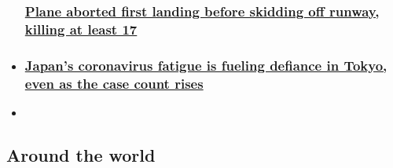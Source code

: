\begin{itemize}
{  \subsubsection{\texorpdfstring{\href{/2020/08/07/asia/plane-crash-calicut-india-intl/index.html}{Plane
  aborted first landing before skidding off runway, killing at least
  17}}{Plane aborted first landing before skidding off runway, killing at least 17}}\label{plane-aborted-first-landing-before-skidding-off-runway-killing-at-least-17}}
\item
  \hypertarget{japans-coronavirus-fatigue-is-fueling-defiance-in-tokyo-even-as-the-case-count-rises}{%
  \subsubsection{\texorpdfstring{\href{/2020/08/07/asia/tokyo-coronavirus-fatigue-intl-hnk/index.html}{Japan's
  coronavirus fatigue is fueling defiance in Tokyo, even as the case
  count
  rises}}{Japan's coronavirus fatigue is fueling defiance in Tokyo, even as the case count rises}}\label{japans-coronavirus-fatigue-is-fueling-defiance-in-tokyo-even-as-the-case-count-rises}}
\end{itemize}

\begin{itemize}
\item
\end{itemize}

\hypertarget{around-the-world-}{%
\subsection{Around the world~}\label{around-the-world-}}

